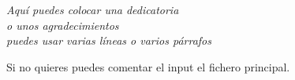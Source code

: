 \chapter*{}

\begin{flushright}
  \it
  Aquí puedes colocar una dedicatoria\\
  o unos agradecimientos\\
  puedes usar varias líneas o varios párrafos
  
  Si no quieres puedes comentar el input el fichero principal.
\end{flushright}
